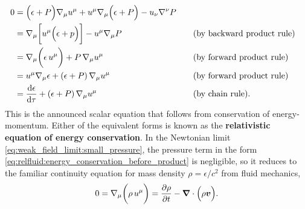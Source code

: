 \begin{subequations}
\begin{align}
	  0 &= \Big(\epsilon + P \Big) \nabla_\mu u^\mu + u^\mu \nabla_\mu \Big( \epsilon + P \Big) - u_\nu \nabla^\nu P \nonumber \\
	    &= \nabla_\mu \bigg[ u^\mu \Big( \epsilon + p \Big)  \bigg] - u^\mu \nabla_\mu P && \quad \text{(by backward product rule)} \nonumber \\
	    &= \nabla_\mu \bigg( \epsilon \, u^\mu \bigg) + P \, \nabla_\mu u^\mu && \quad \text{(by forward product rule)} \label{eq:relfluid:energy_conservation_before_product} \\
	    &= u^\mu \nabla_\mu \epsilon + \left( \epsilon + P \right) \nabla_\mu u^\mu && \quad \text{(by forward product rule)} \label{eq:relfluid:energy_conservation_after_product} \\
	    &= \odv{\epsilon}{\tau} + \left( \epsilon + P \right) \nabla_\mu u^\mu && \quad \text{(by chain rule)} . \label{eq:relfluid:energy_conservation_after_chain}
\end{align}%
\label{eq:relfluid:energy_conservation}%
\end{subequations}%
This is the announced scalar equation that follows from conservation of energy-momentum.
Either of the equivalent forms is known as the \textbf{relativistic equation of energy conservation}.
In the Newtonian limit \eqref{eq:weak_field_limit:small_pressure}, the pressure term in the form \eqref{eq:relfluid:energy_conservation_before_product} is negligible, so it reduces to the familiar continuity equation for mass density $\rho = \epsilon / c^2$ from fluid mechanics,
\cite[equation 7.1]{ref:iver}
\begin{equation}
	0 = \nabla_\mu \bigg( \rho \, u^\mu \bigg) = \pdv{\rho}{t} - {\bm{\nabla}} \cdot \Big( \rho {\bm{v}} \Big).
\end{equation}

